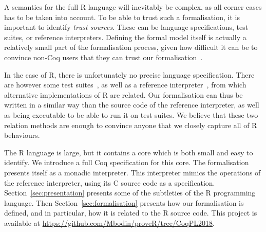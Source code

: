\documentclass[9pt, sigplan, natbib=false, screen=true]{acmart}
\newcommand\Coq{Coq}
\newcommand\R{R}
\newcommand\Cn{C}
\begin{document}
A semantics for the full \R{} language will inevitably
be complex, as all corner cases has to be taken into account.
%
To be able to trust such a formalisation,
it is important to identify \emph{trust sources}.
These can be language specifications,
test suites,
or reference interpreters.
%
Defining the formal model itself
is actually a relatively small part of the formalisation process,
given how difficult it can be to convince non-\Coq{} users
that they can trust our formalisation~\parencite{leroy2014pip}.




In the case of \R{}, there is unfortunately
no precise language specification.
There are however some test suites~\parencite{2014testr, maj2013testr},
as well as a reference interpreter~\parencite{team2000r},
from which alternative implementations of \R{} are related.
%
Our formalisation can thus be written in a similar
way than the source code of the reference interpreter,
as well as being executable to be able to run it on test suites.
We believe that these two relation methods are enough
to convince anyone that we closely capture all of \R{} behaviours.

The \R{} language is large,
but it contains a core which is both small and easy to identify.
We introduce a full \Coq{} specification for this core.
The formalisation presents itself as a monadic interpreter.
This interpreter mimics the operations of the reference interpreter,
using its \Cn{} source code as a specification.
%
Section~\ref{sec:presentation} presents some of the subtleties of the \R{} programming language.
Then Section~\ref{sec:formalisation} presents how our formalisation is defined,
and in particular, how it is related to the \R{} source code.
This project is available at \url{https://github.com/Mbodin/proveR/tree/CoqPL2018}.
\end{document}
